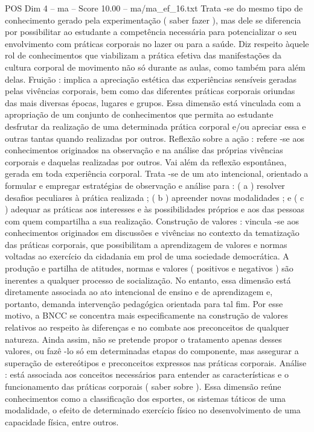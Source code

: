 \begin{textsample}{POS Dim 4 – ma – Score 10.00 – ma/ma\_ef\_16.txt}
Trata -se do mesmo tipo de conhecimento gerado pela experimentação ( saber fazer ), mas dele se diferencia por possibilitar ao estudante a competência necessária para potencializar o seu envolvimento com práticas corporais no lazer ou para a saúde.
Diz respeito àquele rol de conhecimentos que viabilizam a prática efetiva das manifestações da cultura corporal de movimento não só durante as aulas, como também para além delas.
Fruição : implica a apreciação estética das experiências sensíveis geradas pelas vivências corporais, bem como das diferentes práticas corporais oriundas das mais diversas épocas, lugares e grupos.
Essa dimensão está vinculada com a apropriação de um conjunto de conhecimentos que permita ao estudante desfrutar da realização de uma determinada prática corporal e/ou apreciar essa e outras tantas quando realizadas por outros.
Reflexão sobre a ação : refere -se aos conhecimentos originados na observação e na análise das próprias vivências corporais e daquelas realizadas por outros.
Vai além da reflexão espontânea, gerada em toda experiência corporal.
Trata -se de um ato intencional, orientado a formular e empregar estratégias de observação e análise para : ( a ) resolver desafios peculiares à prática realizada ; ( b ) apreender novas modalidades ; e ( c ) adequar as práticas aos interesses e às possibilidades próprios e aos das pessoas com quem compartilha a sua realização.
Construção de valores : vincula -se aos conhecimentos originados em discussões e vivências no contexto da tematização das práticas corporais, que possibilitam a aprendizagem de valores e normas voltadas ao exercício da cidadania em prol de uma sociedade democrática.
A produção e partilha de atitudes, normas e valores ( positivos e negativos ) são inerentes a qualquer processo de socialização.
No entanto, essa dimensão está diretamente associada ao ato intencional de ensino e de aprendizagem e, portanto, demanda intervenção pedagógica orientada para tal fim.
Por esse motivo, a BNCC se concentra mais especificamente na construção de valores relativos ao respeito às diferenças e no combate aos preconceitos de qualquer natureza.
Ainda assim, não se pretende propor o tratamento apenas desses valores, ou fazê -lo só em determinadas etapas do componente, mas assegurar a superação de estereótipos e preconceitos expressos nas práticas corporais.
Análise : está associada aos conceitos necessários para entender as características e o funcionamento das práticas corporais ( saber sobre ).
Essa dimensão reúne conhecimentos como a classificação dos esportes, os sistemas táticos de uma modalidade, o efeito de determinado exercício físico no desenvolvimento de uma capacidade física, entre outros.

\end{textsample}
